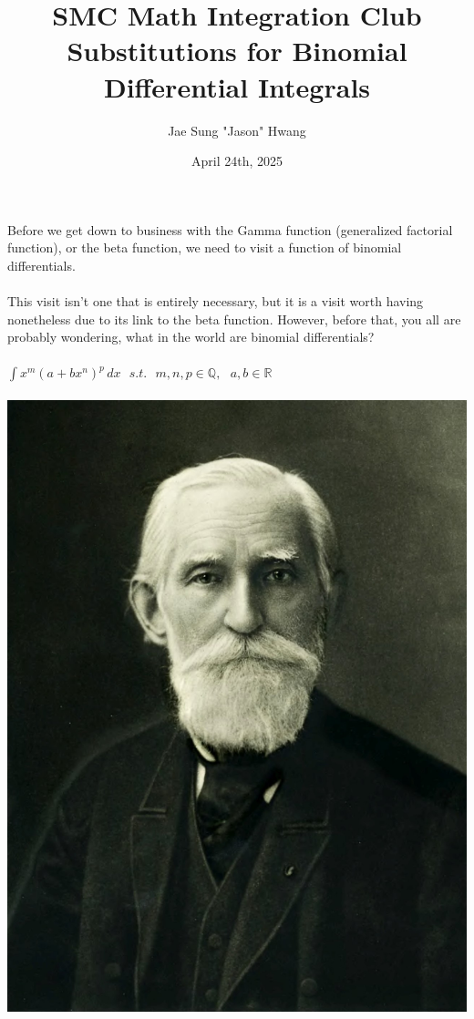 \documentclass[11pt]{article}
\title{SMC Math Integration Club\\Substitutions for Binomial Differential Integrals}
\author{Jae Sung "Jason" Hwang}
\date{April 24th, 2025}
\begin{document}
\maketitle

\pagebreak
{Before we get down to business with the Gamma function (generalized factorial function), or the beta function, we need to visit a function of binomial differentials.} \\
\\ {This visit isn't one that is entirely necessary, but it is a visit worth having nonetheless due to its link to the beta function. However, before that, you all are probably wondering, what in the world are binomial differentials?} \\
\\${\displaystyle \int x^{m}(a+bx^{n})^{p} \,dx \text{  } s.t. \text{  } m,n,p \in \mathbb{Q}, \text{  } a,b \in \mathbb{R} }$ \\ 
\\ \includegraphics[scale=0.05]{Pafnuty_Lvovich_Chebyshev.jpg} \\
\end{document}
